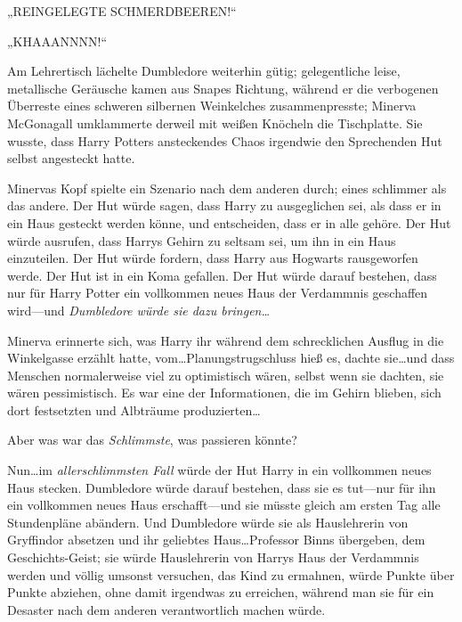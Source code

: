 \later

„REINGELEGTE SCHMERDBEEREN!“%

\later

„KHAAANNNN!“%

\later

Am Lehrertisch lächelte Dumbledore weiterhin gütig; gelegentliche leise, metallische Geräusche kamen aus Snapes Richtung, während er die verbogenen Überreste eines schweren silbernen Weinkelches zusammenpresste; Minerva McGonagall umklammerte derweil mit weißen Knöcheln die Tischplatte. Sie wusste, dass Harry Potters ansteckendes Chaos irgendwie den Sprechenden Hut selbst angesteckt hatte.

Minervas Kopf spielte ein Szenario nach dem anderen durch; eines schlimmer als das andere. Der Hut würde sagen, dass Harry zu ausgeglichen sei, als dass er in ein Haus gesteckt werden könne, und entscheiden, dass er in alle gehöre. Der Hut würde ausrufen, dass Harrys Gehirn zu seltsam sei, um ihn in ein Haus einzuteilen. Der Hut würde fordern, dass Harry aus Hogwarts rausgeworfen werde. Der Hut ist in ein Koma gefallen. Der Hut würde darauf bestehen, dass nur für Harry Potter ein vollkommen neues Haus der Verdammnis geschaffen wird—und \emph{Dumbledore würde sie dazu bringen…}

Minerva erinnerte sich, was Harry ihr während dem schrecklichen Ausflug in die Winkelgasse erzählt hatte, vom…Planungstrugschluss hieß es, dachte sie…und dass Menschen normalerweise viel zu optimistisch wären, selbst wenn sie dachten, sie wären pessimistisch. Es war eine der Informationen, die im Gehirn blieben, sich dort festsetzten und Albträume produzierten…

Aber was war das \emph{Schlimmste}, was passieren könnte?

Nun…im \emph{allerschlimmsten Fall} würde der Hut Harry in ein vollkommen neues Haus stecken. Dumbledore würde darauf bestehen, dass sie es tut—nur für ihn ein vollkommen neues Haus erschafft—und sie müsste gleich am ersten Tag alle Stundenpläne abändern. Und Dumbledore würde sie als Hauslehrerin von Gryffindor absetzen und ihr geliebtes Haus…Professor Binns übergeben, dem Geschichts-Geist; sie würde Hauslehrerin von Harrys Haus der Verdammnis werden und völlig umsonst versuchen, das Kind zu ermahnen, würde Punkte über Punkte abziehen, ohne damit irgendwas zu erreichen, während man sie für ein Desaster nach dem anderen verantwortlich machen würde.

